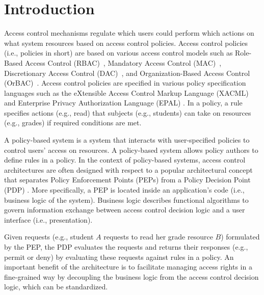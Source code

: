 \section{Introduction} \label{sec:introduction}

Access control mechanisms regulate which users
could perform which actions on what system resources based on access control policies.
Access control policies (i.e., policies in short) are based on various access control models such as Role-Based Access Control (RBAC)~\cite{ferraiolo:rbac}, Mandatory Access Control (MAC)~\cite{mac}, Discretionary Access Control (DAC)~\cite{dac}, and Organization-Based Access Control (OrBAC)~\cite{orbac}.
Access control policies are specified in various policy specification languages such
as the eXtensible Access Control Markup Language (XACML) \cite{sunxacml}
and Enterprise Privacy Authorization Language (EPAL) \cite{epal}.
In a policy, a rule specifies actions (e.g., read) that subjects (e.g., students) can take on resources (e.g., grades) if required conditions are met.



A policy-based system is a system that interacts with user-specified policies
to control users' access on resources. A policy-based system allows policy authors to define rules in a policy.
In the context of policy-based systems,
access control architectures are often designed with respect to a popular
architectural concept that separates Policy Enforcement Points (PEPs) from a Policy Decision Point (PDP) \cite{separation}. More specifically, a PEP is located inside an 
application's code (i.e., business logic of the system).
Business logic describes functional algorithms to govern information exchange between access control decision logic and a user interface (i.e., presentation).

Given requests (e.g., student $A$ requests to read her grade resource $B$) formulated by the PEP, the PDP evaluates the requests and returns their responses (e.g., permit or deny) by evaluating these requests
against rules in a policy. An important benefit of the architecture is to facilitate managing access rights in a fine-grained way by
decoupling the business logic from the access control decision logic, which can be standardized.

